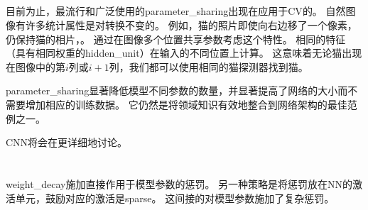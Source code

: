 \subsection{}
目前为止，最流行和广泛使用的\gls{parameter_sharing}出现在应用于\gls{CV}的。
自然图像有许多统计属性是对转换不变的。
例如，猫的照片即使向右边移了一个像素，仍保持猫的相片，。
通过在图像多个位置共享参数考虑这个特性。
相同的特征（具有相同权重的\gls{hidden_unit}）在输入的不同位置上计算。
这意味着无论猫出现在图像中的第$i$列或$i + 1$列，我们都可以使用相同的猫探测器找到猫。

\gls{parameter_sharing}显著降低模型不同参数的数量，并显著提高了网络的大小而不需要增加相应的训练数据。
它仍然是将领域知识有效地整合到网络架构的最佳范例之一。

\gls{CNN}将会在更详细地讨论。

\section{}
\label{sec:sparse_representations}
\gls{weight_decay}施加直接作用于模型参数的惩罚。
另一种策略是将惩罚放在\gls{NN}的激活单元，鼓励对应的激活是\gls{sparse}。
这间接的对模型参数施加了复杂惩罚。

